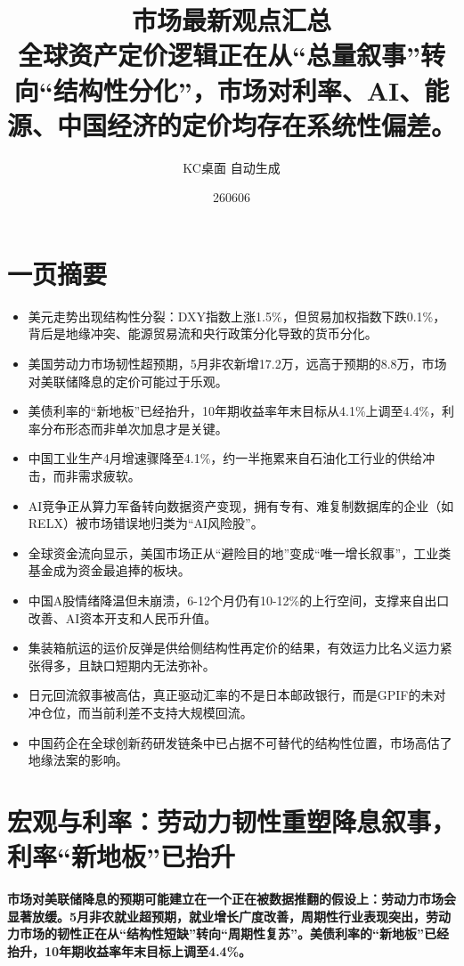 \documentclass[11pt]{ctexart}
\title{\textbf{市场最新观点汇总}\\[0.4em]{\large 全球资产定价逻辑正在从“总量叙事”转向“结构性分化”，市场对利率、AI、能源、中国经济的定价均存在系统性偏差。}}
\author{KC桌面 自动生成}
\date{260606}
\begin{document}
\maketitle
\tableofcontents
\newpage
\section{一页摘要}
\begin{itemize}
  \item 美元走势出现结构性分裂：DXY指数上涨1.5\%，但贸易加权指数下跌0.1\%，背后是地缘冲突、能源贸易流和央行政策分化导致的货币分化。
  \item 美国劳动力市场韧性超预期，5月非农新增17.2万，远高于预期的8.8万，市场对美联储降息的定价可能过于乐观。
  \item 美债利率的“新地板”已经抬升，10年期收益率年末目标从4.1\%上调至4.4\%，利率分布形态而非单次加息才是关键。
  \item 中国工业生产4月增速骤降至4.1\%，约一半拖累来自石油化工行业的供给冲击，而非需求疲软。
  \item AI竞争正从算力军备转向数据资产变现，拥有专有、难复制数据库的企业（如RELX）被市场错误地归类为“AI风险股”。
  \item 全球资金流向显示，美国市场正从“避险目的地”变成“唯一增长叙事”，工业类基金成为资金最追捧的板块。
  \item 中国A股情绪降温但未崩溃，6-12个月仍有10-12\%的上行空间，支撑来自出口改善、AI资本开支和人民币升值。
  \item 集装箱航运的运价反弹是供给侧结构性再定价的结果，有效运力比名义运力紧张得多，且缺口短期内无法弥补。
  \item 日元回流叙事被高估，真正驱动汇率的不是日本邮政银行，而是GPIF的未对冲仓位，而当前利差不支持大规模回流。
  \item 中国药企在全球创新药研发链条中已占据不可替代的结构性位置，市场高估了地缘法案的影响。
\end{itemize}
\section{宏观与利率：劳动力韧性重塑降息叙事，利率“新地板”已抬升}
\textbf{市场对美联储降息的预期可能建立在一个正在被数据推翻的假设上：劳动力市场会显著放缓。5月非农就业超预期，就业增长广度改善，周期性行业表现突出，劳动力市场的韧性正在从“结构性短缺”转向“周期性复苏”。美债利率的“新地板”已经抬升，10年期收益率年末目标上调至4.4\%。}
\end{document}
